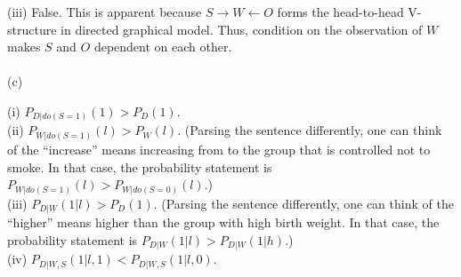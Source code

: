 \documentclass{article}
\newcommand{\qeds}{\hfill\qedsymbol}
\begin{document}
\noindent
(iii) False. This is apparent because $S \rightarrow W \leftarrow O$ forms the head-to-head V-structure in
directed graphical model. Thus, condition on the observation of $W$ makes $S$ and $O$ dependent on each other.\qeds
\\
\\

\noindent
(c)

(i) $P_{D|do(S=1)}(1) > P_D(1)$.
\\

(ii) $P_{W|do(S=1)}(l) > P_W(l)$. (Parsing the sentence differently, one can think of the ``increase'' means increasing from to the group that is controlled not to smoke. In that case, the probability statement is
$P_{W|do(S=1)}(l) > P_{W|do(S=0)}(l)$.)
\\

(iii) $P_{D|W}(1|l) > P_D(1)$. (Parsing the sentence differently, one can think of the ``higher'' means higher than the group with high birth weight. In that case, the probability statement is
$P_{D|W}(1|l) > P_{D|W}(1|h)$.)
\\

(iv) $P_{D|W, S}(1|l, 1) < P_{D|W, S}(1|l, 0)$.
\end{document}
